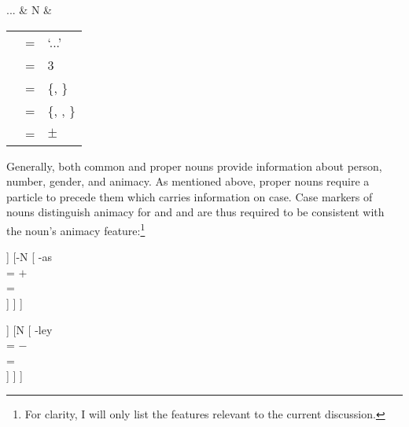 	\begin{tabu} {}
	...
		& N
		& \begin{tabular}[t]{l l l}
			\ups{\Pred} & = & `...' \\
			\ups{\Pers} & = & 3 \\
			\ups{\Num} & = & \{\Sg{}, \Pl{}\} \\
			\ups{\Gend} & = & \{\M{}, \F{}, \N{}\} \\
			\ups{\Anim} & = & $\pm$ \\
		\end{tabular}
	\end{tabu}

\xe

Generally, both common and proper nouns provide information about person, 
number, gender, and animacy. As mentioned above, proper nouns require a 
particle to precede them which carries information on case. Case markers of 
nouns distinguish animacy for \Aarg{} and \Parg{} and are thus required to be 
consistent with the noun's animacy feature:\footnote{For clarity, I will only 
list the features relevant to the current discussion.}

\ex{}%
\begin{minipage}[t]{.5\linewidth}
\tl\label{ex:animok}\quad %
\begin{forest}
[{%
\xhead{N} \\
\ups{\Anim} = $+$ \\
\ups{\Case} = \Parg{}
}
	[N\tsub{stem}
		[{%
			gan \\
			\ups{\Anim} = $+$ \\
		}]
	]
	[-N
		[{%
			-as \\
			\ups{\Anim} = $+$ \\
			\ups{\Case} = \Parg{} \\
		}]
	]
]
\end{forest}
\end{minipage}
\begin{minipage}[t]{.5\linewidth}
\tl\label{ex:animclash}\quad %
\ljudge*\begin{forest}
[{%
\xhead{N} \\
\ups{\Anim} = \err{} \\
\ups{\Case} = \Parg{}
}
	[N\tsub{stem}
		[{%
			gan \\
			\ups{\Anim} = $+$ \\
		}]
	]
	[N
		[{%
			-ley \\
			\ups{\Anim} = $-$ \\
			\ups{\Case} = \Parg{} \\
		}]
	]
]
\end{forest}
\end{minipage}
\xe

